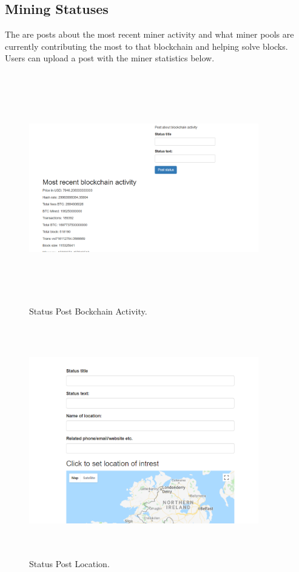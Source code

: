 \subsection{Mining Statuses}
The are posts about the most recent miner activity and what miner pools are currently contributing the most to that blockchain and helping solve blocks. Users can upload a post with the miner statistics below.
\begin{figure}[H]
\centering
\includegraphics[width=10cm, height=10cm]{img/post3.png}
\caption{Status Post Bockchain Activity.}
\end{figure}

\begin{figure}[H]
\centering
\includegraphics[width=10cm, height=10cm]{img/post4.png}
\caption{Status Post Location.}
\end{figure}

